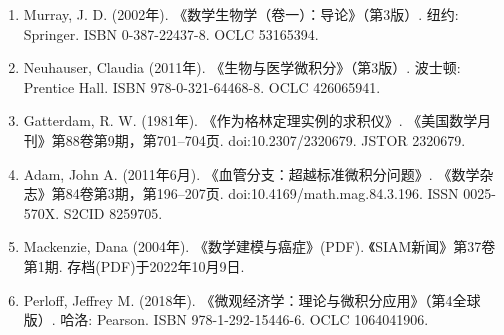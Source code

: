 \begin{enumerate}
\item Murray, J. D. (2002年). 《数学生物学（卷一）：导论》（第3版）. 纽约: Springer. ISBN 0-387-22437-8. OCLC 53165394.
\item Neuhauser, Claudia (2011年). 《生物与医学微积分》（第3版）. 波士顿: Prentice Hall. ISBN 978-0-321-64468-8. OCLC 426065941.
\item Gatterdam, R. W. (1981年). 《作为格林定理实例的求积仪》. 《美国数学月刊》第88卷第9期，第701–704页. doi:10.2307/2320679. JSTOR 2320679.
\item Adam, John A. (2011年6月). 《血管分支：超越标准微积分问题》. 《数学杂志》第84卷第3期，第196–207页. doi:10.4169/math.mag.84.3.196. ISSN 0025-570X. S2CID 8259705.
\item Mackenzie, Dana (2004年). 《数学建模与癌症》(PDF). 《SIAM新闻》第37卷第1期. 存档(PDF)于2022年10月9日.
\item Perloff, Jeffrey M. (2018年). 《微观经济学：理论与微积分应用》（第4全球版）. 哈洛: Pearson. ISBN 978-1-292-15446-6. OCLC 1064041906.
\end{enumerate}
